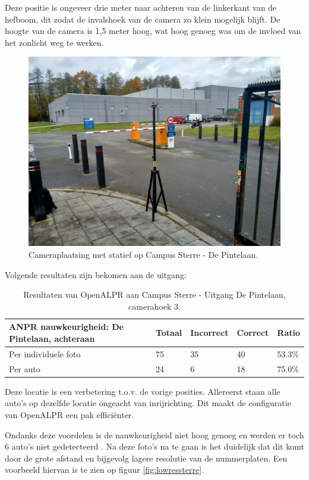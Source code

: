 Deze positie is ongeveer drie meter naar achteren van de linkerkant van de hefboom, dit zodat de invalshoek van de camera zo klein mogelijk blijft. De hoogte van de camera is 1,5 meter hoog, wat hoog genoeg was om de invloed van het zonlicht weg te werken.
\begin{figure}[h!]
	\centering
	\includegraphics[width=0.8\linewidth]{img/depintelaanstatief.jpg}
	\caption{Cameraplaatsing met statief op Campus Sterre - De Pintelaan.}
	\label{plaatsingdepintelaan}
\end{figure}

Volgende resultaten zijn bekomen aan de uitgang:
\begin{table}[h!]
	\centering
	\begin{tabular}{l|l|l|l|l}
		\textbf{ANPR nauwkeurigheid: De Pintelaan, achteraan} & Totaal & Incorrect & Correct & Ratio	\\ \hline
		Per individuele foto 	& 75 & 35	& 40	& 53.3\%\\
		Per auto				& 24 & 6	& 18 	& 75.0\%\\
	\end{tabular}
\caption{Resultaten van OpenALPR aan Campus Sterre - Uitgang De Pintelaan, camerahoek 3.}
\label{tab:alprdepintelaan3}
\end{table}

Deze locatie is een verbetering t.o.v. de vorige posities. Allereerst staan alle auto's op dezelfde locatie ongeacht van inrijrichting. Dit maakt de configuratie van OpenALPR een pak efficiënter.

Ondanks deze voordelen is de nauwkeurigheid niet hoog genoeg en werden er toch 6 auto's niet gedetecteerd . Na deze foto's na te gaan is het duidelijk dat dit komt door de grote afstand en bijgevolg lagere resolutie van de nummerplaten. Een voorbeeld hiervan is te zien op figuur \ref{fig:lowressterre}.

